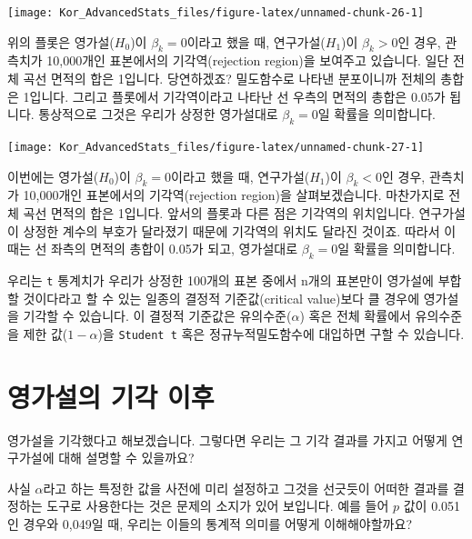 \documentclass[
]{book}
\begin{document}
\begin{center}\texttt{[image: Kor\_AdvancedStats\_files/figure-latex/unnamed-chunk-26-1]} \end{center}

위의 플롯은 영가설(\(H_0\))이 \(\beta_k = 0\)이라고 했을 때, 연구가설(\(H_1\))이 \(\beta_k > 0\)인 경우, 관측치가 10,000개인 표본에서의 기각역(rejection region)을 보여주고 있습니다. 일단 전체 곡선 면적의 합은 1입니다. 당연하겠죠? 밀도함수로 나타낸 분포이니까 전체의 총합은 1입니다. 그리고 플롯에서 기각역이라고 나타난 선 우측의 면적의 총합은 0.05가 됩니다. 통상적으로 그것은 우리가 상정한 영가설대로 \(\beta_k = 0\)일 확률을 의미합니다.

\begin{center}\texttt{[image: Kor\_AdvancedStats\_files/figure-latex/unnamed-chunk-27-1]} \end{center}

이번에는 영가설(\(H_0\))이 \(\beta_k = 0\)이라고 했을 때, 연구가설(\(H_1\))이 \(\beta_k < 0\)인 경우, 관측치가 10,000개인 표본에서의 기각역(rejection region)을 살펴보겠습니다. 마찬가지로 전체 곡선 면적의 합은 1입니다. 앞서의 플롯과 다른 점은 기각역의 위치입니다. 연구가설이 상정한 계수의 부호가 달라졌기 때문에 기각역의 위치도 달라진 것이죠. 따라서 이때는 선 좌측의 면적의 총합이 0.05가 되고, 영가설대로 \(\beta_k = 0\)일 확률을 의미합니다.

우리는 \texttt{t} 통계치가 우리가 상정한 100개의 표본 중에서 n개의 표본만이 영가설에 부합할 것이다라고 할 수 있는 일종의 결정적 기준값(critical value)보다 클 경우에 영가설을 기각할 수 있습니다. 이 결정적 기준값은 유의수준(\(\alpha\)) 혹은 전체 확률에서 유의수준을 제한 값(\(1-\alpha\))을 \texttt{Student\ t} 혹은 정규누적밀도함수에 대입하면 구할 수 있습니다.

\hypertarget{uxc601uxac00uxc124uxc758-uxae30uxac01-uxc774uxd6c4}{%
\section{영가설의 기각 이후}\label{uxc601uxac00uxc124uxc758-uxae30uxac01-uxc774uxd6c4}}

영가설을 기각했다고 해보겠습니다. 그렇다면 우리는 그 기각 결과를 가지고 어떻게 연구가설에 대해 설명할 수 있을까요?

사실 \(\alpha\)라고 하는 특정한 값을 사전에 미리 설정하고 그것을 선긋듯이 어떠한 결과를 결정하는 도구로 사용한다는 것은 문제의 소지가 있어 보입니다. 예를 들어 \(p\) 값이 0.051인 경우와 0,049일 때, 우리는 이들의 통계적 의미를 어떻게 이해해야할까요?
\end{document}
